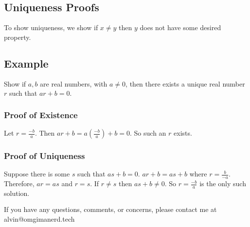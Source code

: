 \documentclass[letterpaper, 12pt]{math}
\begin{document}
\subsection*{Uniqueness Proofs}
To show uniqueness, we show if \( x \neq y \) then \( y \) does not have some
desired property.

\subsection*{Example}
Show if \( a,b \) are real numbers, with \( a \neq 0 \), then there exists a
unique real number \( r \) such that \( ar+b = 0 \).

\subsubsection*{Proof of Existence}
Let \( r = \frac{-b}{a} \). Then \( ar+b = a(\frac{-b}{a})+b = 0 \). So such an
\( r \) exists.

\subsubsection*{Proof of Uniqueness}
Suppose there is some \( s \) such that \( as+b = 0 \). \( ar+b = as+b \) where
\( r = \frac{b}{-a} \). Therefore, \( ar = as \) and \( r = s \). If
\( r \neq s \) then \( as+b \neq 0 \). So \( r = \frac{-b}{a} \) is the only
such solution.

\begin{center}
  If you have any questions, comments, or concerns, please contact me at
  alvin@omgimanerd.tech
\end{center}
\end{document}
